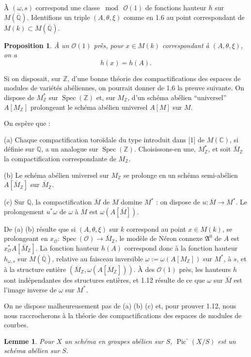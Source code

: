 \documentclass[12pt,a4paper]{article}
\theoremstyle{plain}
\newtheorem{lemma}[theorem]{Lemme}
\newtheorem{proposition}[theorem]{Proposition}
\theoremstyle{definition}
\theoremstyle{remark}
\DeclareMathOperator{\Spec}{Spec}
\DeclareMathOperator{\Pic}{Pic}
\newcommand{\CC}{\mathbb{C}}
\newcommand{\QQ}{\mathbb{Q}}
\newcommand{\ZZ}{\mathbb{Z}}
\newcommand{\cO}{\mathcal{O}}
\newcommand{\fA}{\mathfrak{A}}
\providecommand{\CC}{\mathbb{C}}
\providecommand{\QQ}{\mathbb{Q}}
\providecommand{\ZZ}{\mathbb{Z}}
\providecommand{\cO}{\mathcal{O}}
\providecommand{\fA}{\mathfrak{A}}
\providecommand{\Spec}{\operatorname{Spec}}
\begin{document}
À $(\omega, s)$ correspond une classe $\bmod\ \cO(1)$ de fonctions hauteur $h$ sur $M(\overline{\QQ})$. Identifions un triple $(A, \theta, \xi)$ comme en 1.6 au point correspondant de $M(k) \subset M(\overline{\QQ})$.

\begin{proposition}
À un $\cO(1)$ près, pour $x \in M(k)$ correspondant à $(A, \theta, \xi)$, on a
\[
h(x) = h(A).
\]
\end{proposition}

Si on disposait, sur $\ZZ$, d'une bonne théorie des compactifications des espaces de modules de variétés abéliennes, on pourrait donner de 1.6 la preuve suivante. On dispose de $M^*_{\ZZ}$ sur $\Spec(\ZZ)$ et, sur $M_{\ZZ}$, d'un schéma abélien ``universel'' $A[M_{\ZZ}]$ prolongeant le schéma abélien universel $A[M]$ sur $M$.

On espère que :

(a) Chaque compactification toroïdale du type introduit dans [1] de $M(\CC)$, si définie sur $\QQ$, a un analogue sur $\Spec(\ZZ)$. Choisissons-en une, $M^*_{\ZZ}$, et soit $\overline{M}_{\ZZ}$ la compactification correspondante de $M_{\ZZ}$.

(b) Le schéma abélien universel sur $M_{\ZZ}$ se prolonge en un schéma semi-abélien $A[\overline{M}_{\ZZ}]$ sur $\overline{M}_{\ZZ}$.

(c) Sur $\QQ$, la compactification $\overline{M}$ de $M$ domine $M^*$ : on dispose de $u : \overline{M} \to M^*$. Le prolongement $u^*\omega$ de $\omega$ à $\overline{M}$ est $\omega(A[\overline{M}])$.

De (a) (b) résulte que si $(A,\theta,\xi)$ sur $k$ correspond au point $x \in M(k)$, se prolongeant en $x_{\cO} : \Spec(\cO) \to \overline{M}_{\ZZ}$, le modèle de Néron connexe $\fA^0$ de $A$ est $x_{\cO}^* A[\overline{M}_{\ZZ}]$. La fonction hauteur $h(A)$ correspond donc à la fonction hauteur $h_{\omega,s}$ sur $M(\overline{\QQ})$, relative au faisceau inversible $\omega := \omega(A[M_{\ZZ}])$ sur $M^*$, à $s$, et à la structure entière $(\overline{M}_{\ZZ}, \omega(A[\overline{M}_{\ZZ}]))$. À des $\cO(1)$ près, les hauteurs $h$ sont indépendantes des structures entières, et 1.12 résulte de ce que $\omega$ sur $\overline{M}$ est l'image inverse de $\omega$ sur $M^*$.

On ne dispose malheureusement pas de (a) (b) (c) et, pour prouver 1.12, nous nous raccrocherons à la théorie des compactifications des espaces de modules de courbes.

\begin{lemma}
Pour $X$ un schéma en groupes abélien sur $S$, $\Pic^\circ(X/S)$ est un schéma abélien sur $S$.
\end{lemma}
\end{document}
